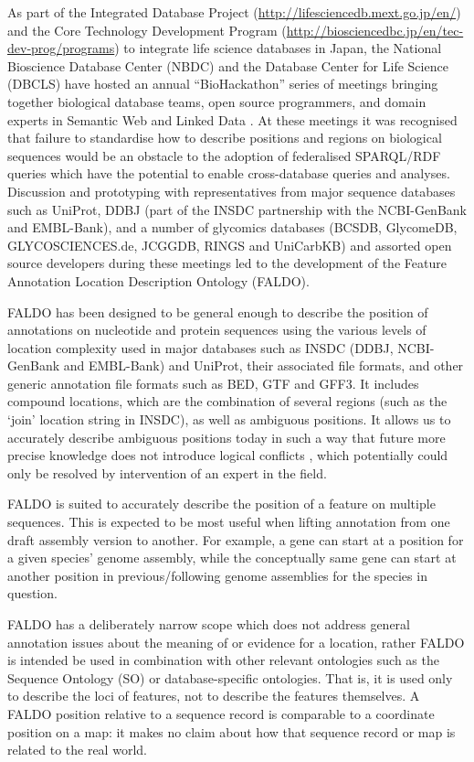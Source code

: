 As part of the Integrated Database Project (\url{http://lifesciencedb.mext.go.jp/en/}) and
the Core Technology Development Program (\url{http://biosciencedbc.jp/en/tec-dev-prog/programs})
to integrate life science databases in Japan, the National Bioscience Database Center (NBDC) and the Database
Center for Life Science (DBCLS) have hosted an annual ``BioHackathon'' series
of meetings bringing together biological database teams, open source programmers,
and domain experts in Semantic Web and Linked Data \cite{BioHack2008,BioHack2009,BioHack2010,BioHack2011and2012}.
At these meetings it was recognised that failure to standardise how to describe positions
and regions on biological sequences would be an obstacle to the adoption of federalised
SPARQL/RDF queries which have the potential to enable cross-database queries and
analyses. Discussion and prototyping with representatives from major sequence databases
such as UniProt\cite{UniProt2013}, DDBJ\cite{DDBJ2013} (part of the INSDC partnership with the NCBI-GenBank\cite{GenBank2013} and EMBL-Bank\cite{ENA2013}),
and a number of glycomics databases 
(BCSDB\cite{doi:10.1021/ci100150d}, GlycomeDB\cite{Ranzinger01012011}, GLYCOSCIENCES.de\cite{Lutteke01052006}, JCGGDB, RINGS\cite{RINGS} and UniCarbKB\cite{UniCarbKB})
and assorted open source developers during these meetings
led to the development of the Feature Annotation Location Description Ontology (FALDO).

FALDO has been designed to be general enough to describe the position of annotations
on nucleotide and protein sequences using the various levels of location complexity used
in major databases such as INSDC (DDBJ, NCBI-GenBank and EMBL-Bank) and UniProt, their
associated file formats, and other generic annotation file formats such as BED,
GTF and GFF3. It includes compound locations, which are the combination of
several regions (such as the `join' location string in INSDC), as well as ambiguous
positions. It allows us to accurately describe ambiguous positions today
in such a way that future more precise knowledge does not introduce logical conflicts 
, which potentially could only be resolved by intervention of an expert in the field.

FALDO is suited to accurately describe the position of
a feature on multiple sequences.
This is expected to be most useful when lifting annotation from one
draft assembly version to another.
For example, a gene can start at a position for a given species' genome assembly,
while the conceptually same gene can start at another position in previous/following genome assemblies for the species in question.

FALDO has a deliberately narrow scope which does not address general annotation
issues about the meaning of or evidence for a location, rather FALDO is intended be
used in combination with other relevant ontologies such as the Sequence Ontology
(SO) \cite{SequenceOntology2005} or database-specific ontologies.
That is, it is used only to describe the loci of features, not to describe the features themselves.
A FALDO position relative to a sequence record is comparable to a
coordinate position on a map: it makes no claim about how that
sequence record or map is related to the real world.
 
